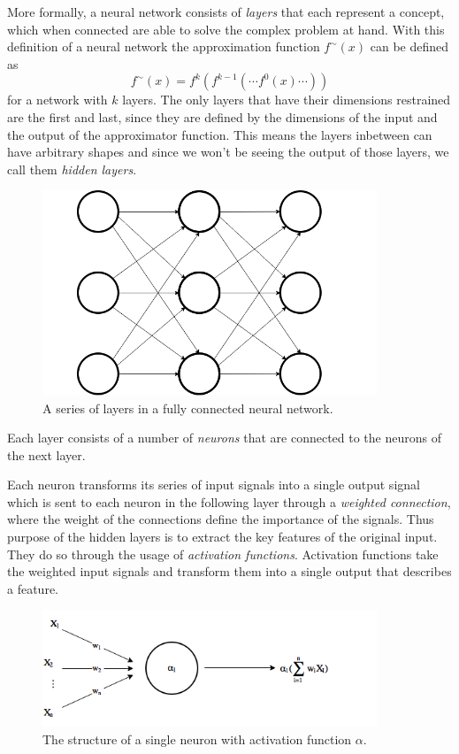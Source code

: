 \documentclass[11pt]{article}
\begin{document}
More formally, a neural network consists of \textit{layers} that each represent a concept, which
when connected are able to solve the complex problem at hand.
With this definition of a neural network the approximation function $f^{\sim}(x)$ can be
defined as
\begin{equation}
    f^{\sim}(x) = f^{k}(f^{k-1}( \cdots f^{0}(x) \cdots))
\end{equation}
for a network with $k$ layers.
The only layers that have their dimensions restrained are the first and last, since they are defined by the
dimensions of the input and the output of the approximator function.
This means the layers inbetween can have arbitrary shapes and
since we won't be seeing the output of those layers, we call them \textit{hidden layers}.
\begin{figure}[!h]
    \centering
    \includegraphics[width=10cm]{include/layers.png}
    \caption{A series of layers in a fully connected neural network.}
    \label{fig:layers}
\end{figure}
Each layer consists of a number of \textit{neurons} that are connected to the neurons of the
next layer.

Each neuron transforms its series of input signals into a single output signal which is sent to
each neuron in the following layer through a \textit{weighted connection}, where
the weight of the connections define the importance of the signals.
Thus purpose of the hidden layers is to extract the key features of the original input.
They do so through the usage of \textit{activation functions}.
Activation functions take the weighted input signals and transform them
into a single output that describes a feature.
\begin{figure}[!h]
    \centering
    \includegraphics[width=10cm]{include/neuron.png}
    \caption{The structure of a single neuron with activation function $\alpha$.}
    \label{fig:neuron}
\end{figure}
\end{document}
